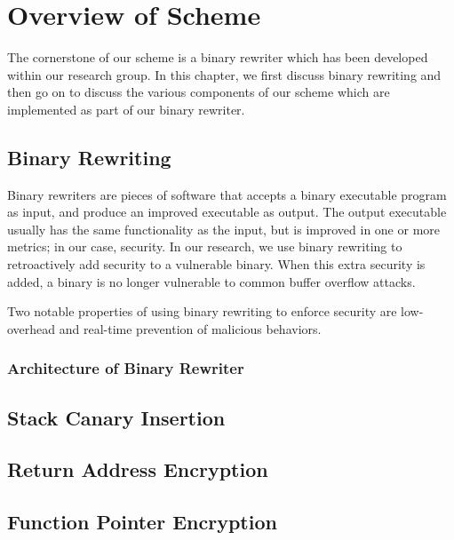 
\renewcommand{\thechapter}{3}

\chapter{Overview of Scheme}

The cornerstone of our scheme is a binary rewriter which has been developed within our research
group. In this chapter, we first discuss binary rewriting and then go on to discuss the various
components of our scheme which are implemented as part of our binary rewriter.

\section{Binary Rewriting}

Binary rewriters are pieces of software that accepts a binary executable program as input, and
produce an improved executable as output. The output executable usually has the same functionality
as the input, but is improved in one or more metrics; in our case, security. In our research, we use
binary rewriting to retroactively add security to a vulnerable binary. When this extra security is
added, a binary is no longer vulnerable to common buffer overflow attacks.

Two notable properties of using binary rewriting to enforce security are low-overhead and real-time
prevention of malicious behaviors. 

\subsection{Architecture of Binary Rewriter}

\section{Stack Canary Insertion}

\section{Return Address Encryption}

\section{Function Pointer Encryption}
